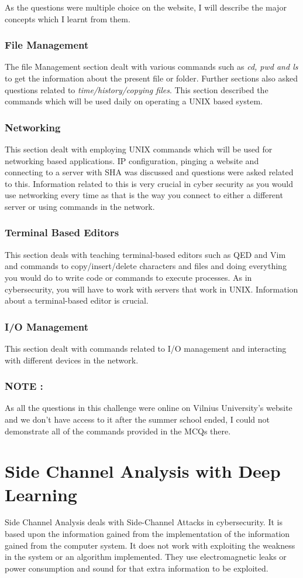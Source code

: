 \documentclass[runningheads]{llncs}
\begin{document}
As the questions were multiple choice on the website, I will describe the major concepts which I learnt from them.
\subsubsection{File Management}
The file Management section dealt with various commands such as \textit{cd, pwd and ls} to get the information about the present file or folder. Further sections also asked questions related to \textit{time/history/copying files}. This section described the commands which will be used daily on operating a UNIX based system.
\subsubsection{Networking}
This section dealt with employing UNIX commands which will be used for networking based applications. IP configuration, pinging a website and connecting to a server with SHA was discussed and questions were asked related to this. Information related to this is very crucial in cyber security as you would use networking every time as that is the way you connect to either a different server or using commands in the network.
\subsubsection{Terminal Based Editors}
This section deals with teaching terminal-based editors such as QED and Vim and commands to copy/insert/delete characters and files and doing everything you would do to write code or commands to execute processes. As in cybersecurity, you will have to work with servers that work in UNIX.
Information about a terminal-based editor is crucial.
\subsubsection{I/O Management}
This section dealt with commands related to I/O management and interacting with different devices in the network.


\subsubsection{NOTE : } As all the questions in this challenge were online on Vilnius University's website and we don't have access to it after 
the summer school ended, I could not demonstrate all of the commands provided in the MCQs there. 

\section{Side Channel Analysis with Deep Learning}
Side Channel Analysis deals with Side-Channel Attacks in cybersecurity. It is based upon the information gained from the implementation of the information gained from the computer system.
It does not work with exploiting the weakness in the system or an algorithm implemented. They use electromagnetic leaks or power consumption and sound for that extra information to be exploited.
\end{document}
